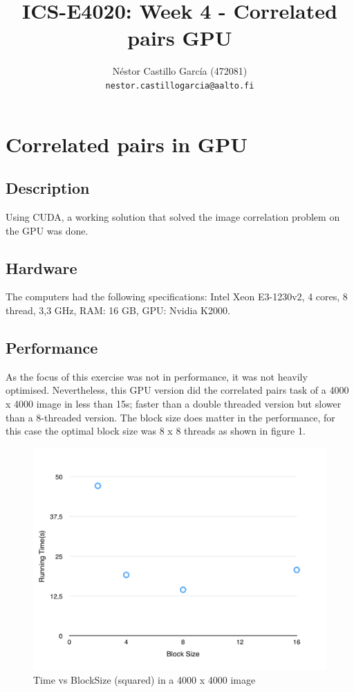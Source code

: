 \documentclass[a4paper,10pt]{article}
\title{ICS-E4020: Week 4 - Correlated pairs GPU}
\author{Néstor Castillo García (472081)\\ 
       {\tt nestor.castillogarcia@aalto.fi}}
\begin{document}
\maketitle

\section{Correlated pairs in GPU }

\subsection{Description}

Using CUDA, a working solution that solved the image correlation problem on the GPU was done.


\subsection{Hardware}
The computers had the following specifications: Intel Xeon E3-1230v2, 4 cores, 8 thread, 3,3 GHz, RAM: 16 GB, GPU: Nvidia K2000.

\subsection{Performance}
As the focus of this exercise was not in performance, it was not heavily optimised. Nevertheless, this GPU version did the correlated pairs task of a 4000 x 4000 image in less than 15s; faster than a double threaded version but slower than a 8-threaded version. The block size does matter in the performance, for this case the optimal block size was 8 x 8 threads as shown in figure 1. 

\begin{figure}[H]
\centering
\includegraphics[width=1\textwidth]{figures/w4_timevsBlockSize}
\caption{Time vs BlockSize (squared) in a 4000 x 4000 image}
\label{fig:pca_type}
\end{figure}
\end{document}
